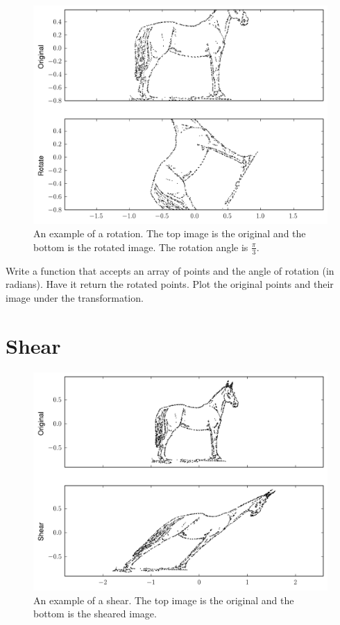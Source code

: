 \begin{figure}
\includegraphics[width=\textwidth]{rotate.pdf}
\caption{An example of a rotation.
The top image is the original and the bottom is the rotated image.
The rotation angle is $\frac{\pi}{3}$.}
\label{basis:rotate}
\end{figure}

\begin{problem}
Write a function that accepts an array of points and the angle of rotation (in radians). Have it return the rotated points.
Plot the original points and their image under the transformation.
\end{problem}

\section*{Shear}

\begin{figure}
\includegraphics[width=\textwidth]{shear.pdf}
\caption{An example of a shear.
The top image is the original and the bottom is the sheared image.}
\label{basis:shear}
\end{figure}

